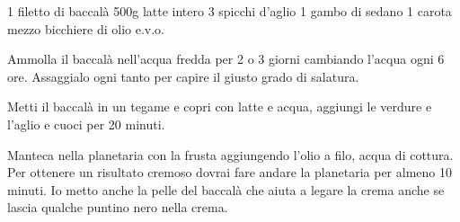 \begin{ingreds}
	1 filetto di baccalà
	500g latte intero
	3 spicchi d'aglio
	1 gambo di sedano
	1 carota
	mezzo bicchiere di olio e.v.o.


\end{ingreds}

\begin{method}
Ammolla il baccalà nell'acqua fredda per 2 o 3 giorni cambiando l'acqua ogni 6 ore. Assaggialo ogni tanto per capire il giusto grado di salatura.

Metti il baccalà in un tegame e copri con latte e acqua, aggiungi le verdure e l'aglio e cuoci per 20 minuti.

Manteca nella planetaria con la frusta aggiungendo l'olio a filo, acqua di cottura. Per ottenere un risultato cremoso dovrai fare andare la planetaria per almeno 10 minuti. Io metto anche la pelle del baccalà che aiuta a legare la crema anche se lascia qualche puntino nero nella crema.



\end{method}



